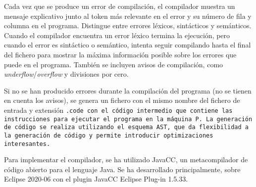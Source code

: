 Cada vez que se produce un error de compilación, el compilador muestra un mensaje explicativo junto al token más relevante en el error y su número de fila y columna en el programa. Distingue entre errores léxicos, sintácticos y semánticos. Cuando el compilador encuentra un error léxico termina la ejecución, pero cuando el error es sintáctico o semántico, intenta seguir compilando hasta el final del fichero para mostrar la máxima información posible sobre los errores que puede en el programa. También se incluyen avisos de compilación, como \textit{underflow}/\textit{overflow} y divisiones por cero.

Si no se han producido errores durante la compilación del programa (no se tienen en cuenta los avisos), se genera un fichero con el mismo nombre del fichero de entrada y extensión \tt{.code} con el código intermedio que contiene las instrucciones para ejecutar el programa en la máquina P. La generación de código se realiza utilizando el esquema AST, que da flexibilidad a la generación de código y permite introducir optimizaciones interesantes.

Para implementar el compilador, se ha utilizado JavaCC, un metacompilador de código abierto para el lenguaje Java.
Se ha desarrollado principalmente, sobre Eclipse 2020-06 con el plugin JavaCC Eclipse Plug-in 1.5.33.
\pagebreak
